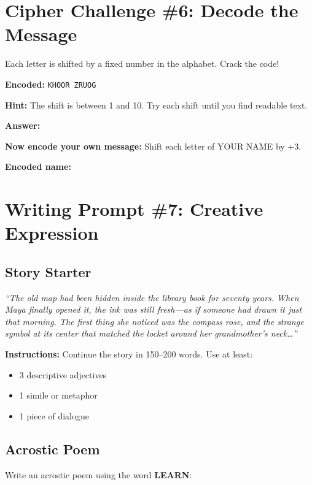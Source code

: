 \documentclass[
    language=english,
    doctype=activity-book,
    institution=none,
]{../../omnilatex}
\begin{document}
\section{Cipher Challenge \#6: Decode the Message}

Each letter is shifted by a fixed number in the alphabet. Crack the code!

\textbf{Encoded:} \texttt{KHOOR ZRUOG}

\noindent\textbf{Hint:} The shift is between 1 and 10. Try each shift until you find readable text.

\noindent\textbf{Answer:} \underline{\hspace{5cm}}

\vspace{1em}

\textbf{Now encode your own message:} Shift each letter of YOUR NAME by +3.

\textbf{Encoded name:} \underline{\hspace{5cm}}

\section{Writing Prompt \#7: Creative Expression}

\subsection{Story Starter}

\textit{``The old map had been hidden inside the library book for seventy years. When Maya finally opened it, the ink was still fresh---as if someone had drawn it just that morning. The first thing she noticed was the compass rose, and the strange symbol at its center that matched the locket around her grandmother's neck\ldots''}

\noindent\textbf{Instructions:} Continue the story in 150--200 words. Use at least:
\begin{itemize}
    \item 3 descriptive adjectives
    \item 1 simile or metaphor
    \item 1 piece of dialogue
\end{itemize}

\subsection{Acrostic Poem}

Write an acrostic poem using the word \textbf{LEARN}:
\end{document}
